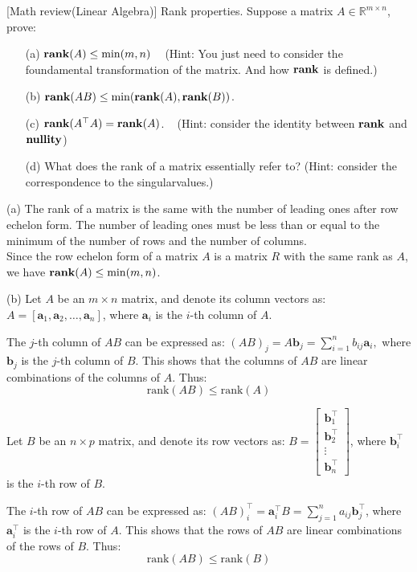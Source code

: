 \item {} [Math review(Linear Algebra)] Rank properties. Suppose a matrix $A\in \mathbb{R}^{m\times n}$, prove:
\begin{itemize}
    \item[(a)] $\mathop{\bf rank}(A)\leq \min(m, n)$ ~ (Hint: You just need to consider the foundamental transformation of the matrix. And how $\mathop{\bf rank}$ is defined.)
    \item[(b)] $\mathop{\bf rank}(AB)\leq \min(\mathop{\bf rank}(A),\mathop{\bf rank}(B))$. ~
    \item[(c)] $\mathop{\bf rank}(A^{\top}A)=\mathop{\bf rank}(A)$. ~ (Hint: consider the identity between $\mathop{\bf rank}$ and $\textbf{nullity}$)
    \item[(d)] What does the rank of a matrix essentially refer to? (Hint: consider the correspondence to the singularvalues.) ~
\end{itemize}

\solution

(a) The rank of a matrix is the same with the number of leading ones after row echelon form. The number of leading ones must be less than or equal to the minimum of the number of rows and the number of columns. \\
Since the row echelon form of a matrix $A$ is a matrix $R$ with the same rank as $A$, we have $\mathop{\bf rank}(A)\leq \min(m, n)$.

(b) Let $A$ be an $m \times n$ matrix, and denote its column vectors as: $A = [\mathbf{a}_1, \mathbf{a}_2, \dots, \mathbf{a}_n]$, where $\mathbf{a}_i$ is the $i$-th column of $A$.

The $j$-th column of $AB$ can be expressed as: $(AB)_j = A \mathbf{b}_j = \sum\limits_{i=1}^n b_{ij} \mathbf{a}_i,$
where $\mathbf{b}_j$ is the $j$-th column of $B$. This shows that the columns of $AB$ are linear combinations of the columns of $A$. Thus:
$$\text{rank}(AB) \leq \text{rank}(A)$$

Let $B$ be an $n \times p$ matrix, and denote its row vectors as: $B = \begin{bmatrix} \mathbf{b}_1^\top \\ \mathbf{b}_2^\top \\ \vdots \\ \mathbf{b}_n^\top \end{bmatrix}$, where $\mathbf{b}_i^\top$ is the $i$-th row of $B$.

The $i$-th row of $AB$ can be expressed as: $(AB)_i^\top = \mathbf{a}_i^\top B = \sum\limits_{j=1}^n a_{ij} \mathbf{b}_j^\top$, where $\mathbf{a}_i^\top$ is the $i$-th row of $A$. This shows that the rows of $AB$ are linear combinations of the rows of $B$. Thus:
$$\text{rank}(AB) \leq \text{rank}(B)$$

